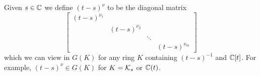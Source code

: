 \documentclass[draft]{article} %
\begin{document}
% 
% 
% 
% 
Given $s\in\mathbb C$ we define $(t-s)^\nu$ to be the diagonal matrix 
\[
\begin{bmatrix}
    (t-s)^{\nu_1} \\
    & (t-s)^{\nu_2} \\ 
    & & \ddots \\
    & & & (t-s)^{\nu_m}
\end{bmatrix} 
\]
which we can view in 
$G(K)$ for any ring $ K $ containing $(t-s)^{-1}$ and $\mathbb C[t]$. For example, $(t-s)^\nu\in G(K)$ for $ K = \mathcal K_s$ or $\mathbb C(t)$. %

\end{document}
